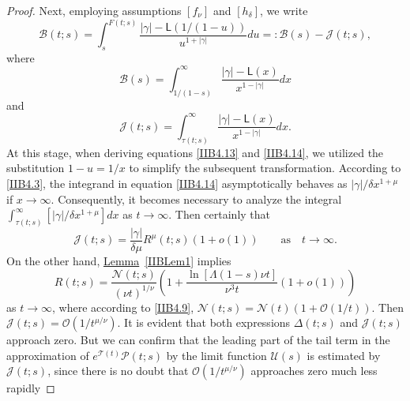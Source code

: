 \documentclass[10pt,a4paper]{amsart}
\begin{document}
\begin{proof}
    Next, employing assumptions $[{f_{\nu}}]$ and $[{h_{\delta}}]$, we write
\begin{equation}                \label{IIB4.12}
    \mathcal{B}(t;s)=\int_{s}^{F(t;s)}{\frac{|\gamma|-\textsf{L}\left({1}\big/{(1-u)}\right)}{{{u}^{1+|\gamma|}}}du}
    =:\mathcal{B}(s)-\mathcal{J}(t;s),
\end{equation}
    where
\begin{equation}                \label{IIB4.13}
    \mathcal{B}(s)=\int_{{1}\big/{(1-s)}}^{\infty}{\frac{|\gamma|-\textsf{L}(x)}{{x^{1-|\gamma|}}}dx}
\end{equation}
    and
\begin{equation}                \label{IIB4.14}
    \mathcal{J}(t;s)=\int_{\tau(t;s)}^{\infty}{\frac{|\gamma|-\textsf{L}(x)}{x^{1-|\gamma|}}dx}.
\end{equation}
    At this stage, when deriving equations {\eqref{IIB4.13}} and {\eqref{IIB4.14}}, we utilized the substitution $1-u={1}/{x}$
    to simplify the subsequent transformation. According to {\eqref{IIB4.3}}, the integrand in equation {\eqref{IIB4.14}}
    asymptotically behaves as ${|\gamma|}/{\delta{x^{1+\mu}}}$ if $x\to\infty$. Consequently, it becomes necessary
    to analyze the integral $\int_{\tau(t;s)}^{\infty}{\left[|\gamma|/{\delta{x^{1+\mu}}}\right]dx}$ as $t\to\infty$.
    Then certainly that
\begin{equation}                \label{IIB4.15}
    \mathcal{J}(t;s)=\frac{|\gamma|}{\delta\mu}{{R}^{\mu}}(t;s)\left(1+o(1)\right)
    \qquad {\text{as}} \quad {t\to\infty}.
\end{equation}
    On the other hand, {\hyperref[IIBLem1]{Lemma}~\ref{IIBLem1}} implies
\begin{equation}                \label{IIB4.16}
    R(t;s)=\frac{\mathcal{N}(t;s)}{{(\nu{t})}^{{1}/{\nu}}}
    \left(1+\frac{\ln\left[\Lambda(1-s)\nu{t}\right]}{{{\nu}^{3}}t}\left(1+o(1)\right)\right)
\end{equation}
    as $t\to\infty$, where according to {\eqref{IIB4.9}},
    $\mathcal{N}(t;s)=\mathcal{N}(t)\left(1+\mathcal{O}\left({1}/{t}\right)\right)$. Then
    $\mathcal{J}(t;s)=\mathcal{O}\left( {1}/{{t^{\mu/\nu}}}\right)$. It is evident that both expressions $\Delta (t;s)$
    and $\mathcal{J}(t;s)$ approach zero. But we can confirm that the leading part of the tail term in the approximation
    of ${e^{\mathcal{T}(t)}}\mathcal{P}(t;s)$ by the limit function $\mathcal{U}(s)$ is estimated by $\mathcal{J}(t;s)$,
    since there is no doubt that $\mathcal{O}\left({1}/{t^{\mu/\nu}}\right)$ approaches zero much less rapidly

\end{proof}
\end{document}
